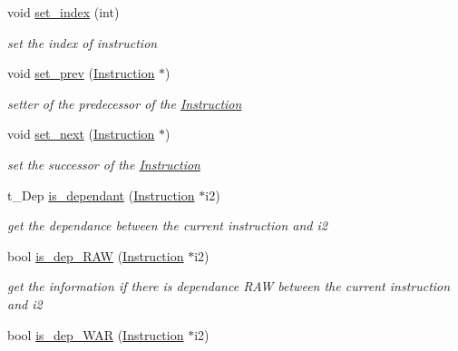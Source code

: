 \begin{DoxyCompactItemize}
void \mbox{\hyperlink{class_instruction_af1608cfea660c46e8a8b4bbac948406a}{set\+\_\+index}} (int)
\begin{DoxyCompactList}\small\item\em set the index of instruction \end{DoxyCompactList}\item 
\mbox{\label{class_instruction_a69d2992a0eb1fbe5fb6a38b52e13a804}} 
void \mbox{\hyperlink{class_instruction_a69d2992a0eb1fbe5fb6a38b52e13a804}{set\+\_\+prev}} (\mbox{\hyperlink{class_instruction}{Instruction}} $\ast$)
\begin{DoxyCompactList}\small\item\em setter of the predecessor of the \mbox{\hyperlink{class_instruction}{Instruction}} \end{DoxyCompactList}\item 
\mbox{\label{class_instruction_a2fb436e52a0cc89e7ec08bf0e105bba3}} 
void \mbox{\hyperlink{class_instruction_a2fb436e52a0cc89e7ec08bf0e105bba3}{set\+\_\+next}} (\mbox{\hyperlink{class_instruction}{Instruction}} $\ast$)
\begin{DoxyCompactList}\small\item\em set the successor of the \mbox{\hyperlink{class_instruction}{Instruction}} \end{DoxyCompactList}\item 
t\+\_\+\+Dep \mbox{\hyperlink{class_instruction_ac8d86b800140a08cb03d82f83f363fa4}{is\+\_\+dependant}} (\mbox{\hyperlink{class_instruction}{Instruction}} $\ast$i2)
\begin{DoxyCompactList}\small\item\em get the dependance between the current instruction and i2 \end{DoxyCompactList}\item 
bool \mbox{\hyperlink{class_instruction_a4c902c5a8fdc8c8841ec24f389605fd5}{is\+\_\+dep\+\_\+\+R\+AW}} (\mbox{\hyperlink{class_instruction}{Instruction}} $\ast$i2)
\begin{DoxyCompactList}\small\item\em get the information if there is dependance R\+AW between the current instruction and i2 ~\newline
 \end{DoxyCompactList}\item 
bool \mbox{\hyperlink{class_instruction_ae79b239c6ab30a15064b5a00944ad65a}{is\+\_\+dep\+\_\+\+W\+AR}} (\mbox{\hyperlink{class_instruction}{Instruction}} $\ast$i2)

\end{DoxyCompactItemize}
